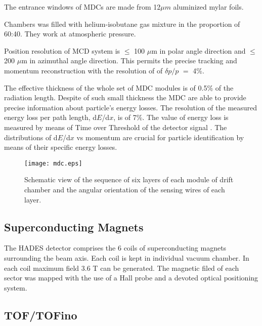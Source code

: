 The entrance windows of  MDCs are made from 12$\mu m$ aluminized mylar foils.

Chambers was filled with helium-isobutane gas mixture in the proportion of 60:40. They work at atmospheric pressure.  

Position resolution of MCD system is $\le$ 100 $\mu$m in polar angle direction and $\le$ 200 $\mu$m 
in azimuthal angle direction. This permits the precise tracking and momentum reconstruction 
with the resolution of of $\delta{p}/p$ $=$ 4\%.

The effective thickness of the whole set of MDC modules is of 0.5\% of the radiation length. 
Despite of such small thickness the MDC are able to provide precise information 
about particle's energy losses. The resolution of the measured energy loss per path length, 
d$E$/d$x$, is of 7\%. The value of energy loss is measured by means of Time over Threshold 
of the detector signal \cite{Kipnis}. 
The distributions of d$E$/d$x$ vs momentum are crucial for particle identification by means 
of their specific energy losses.

\begin{figure}
	\centering
	\texttt{[image: mdc.eps]}
	\caption{Schematic view of the sequence of six layers of each module of drift chamber 
	and the angular orientation of the sensing wires of each layer.}
	\label{mdc}
\end{figure}



\subsection{Superconducting Magnets}

The HADES detector comprises the 6 coils of superconducting magnets surrounding the beam axis. 
Each coil is kept in individual vacuum chamber. 
In each coil maximum field 3.6 T can be generated. 
The magnetic filed of each sector was mapped with the use of a Hall probe 
and a devoted optical positioning system. 

\subsection{TOF/TOFino}


